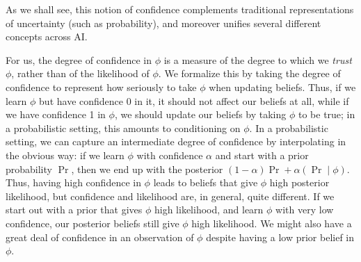 \documentclass{uai2023} %
\begin{document}
{%
As we shall see, this notion of confidence
complements traditional representations of uncertainty (such as probability),
and moreover unifies several different concepts
across AI.
}

For us, the degree of confidence in $\phi$ is a measure of the degree
to which we \emph{trust} $\phi$,
rather than of the likelihood of $\phi$.  We formalize this by taking
the degree of confidence to represent how seriously to take $\phi$
when updating beliefs. 
Thus, if we learn $\phi$ but have confidence 0 in it, it should not
affect our beliefs at all, while if we have confidence 1 in $\phi$, we
should update our beliefs by taking $\phi$ to be true; in a
probabilistic setting, this amounts to conditioning on $\phi$.  In a
probabilistic setting, we can capture an  intermediate degree of
confidence by 
interpolating in the obvious way: if we learn $\phi$ with confidence
$\alpha$ 
and start with a prior probability $\Pr$, then we end up with the
posterior $(1-\alpha)\Pr + \alpha (\Pr\mid \phi)$.
Thus, having high confidence in $\phi$ leads to beliefs that give $\phi$
high posterior likelihood, but confidence and likelihood are, in
general, quite different.   If we start out with a prior that gives
$\phi$ high likelihood, and learn $\phi$ with very low confidence, our
posterior beliefs still give $\phi$ high likelihood.  We might also
have a great deal of confidence in an observation of $\phi$ 
despite having a low prior belief in $\phi$.


\end{document}
